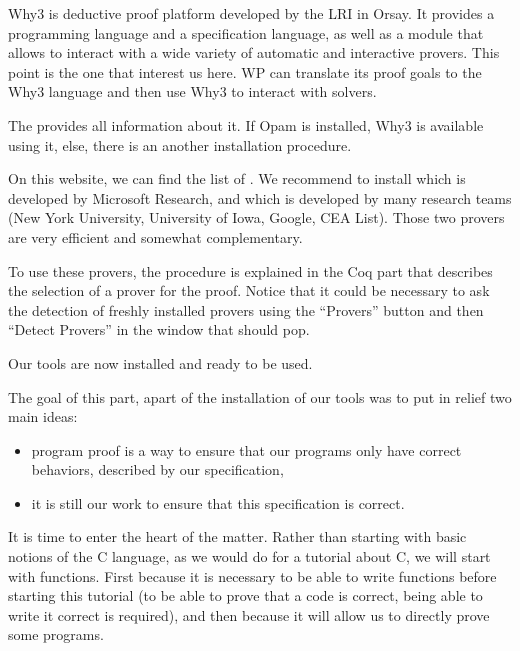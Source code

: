 \documentclass[middle]{zmdocument}
\begin{document}
Why3 is deductive proof platform developed by the LRI in Orsay. It
provides a programming language and a specification language, as well as
a module that allows to interact with a wide variety of automatic and
interactive provers. This point is the one that interest us here. WP can
translate its proof goals to the Why3 language and then use Why3 to
interact with solvers.



The  provides all information
about it. If Opam is installed, Why3 is available using it, else, there
is an another installation procedure.



On this website, we can find the list of
.
We recommend to install
 which is
developed by Microsoft Research, and
 which is developed by many
research teams (New York University, University of Iowa, Google, CEA
List). Those two provers are very efficient and somewhat complementary.



To use these provers, the procedure is explained in the Coq part that
describes the selection of a prover for the proof. Notice that it could
be necessary to ask the detection of freshly installed provers using the
``Provers'' button and then ``Detect Provers'' in the window that should
pop.




\horizontalLine



Our tools are now installed and ready to be used.



The goal of this part, apart of the installation of our tools was to put
in relief two main ideas:


\begin{itemize}
\item program proof is a way to ensure that our programs only have correct
  behaviors, described by our specification,
\item it is still our work to ensure that this specification is correct.
\end{itemize}




It is time to enter the heart of the matter. Rather than starting with
basic notions of the C language, as we would do for a tutorial about C,
we will start with functions. First because it is necessary to be able
to write functions before starting this tutorial (to be able to prove
that a code is correct, being able to write it correct is required), and
then because it will allow us to directly prove some programs.
\end{document}
